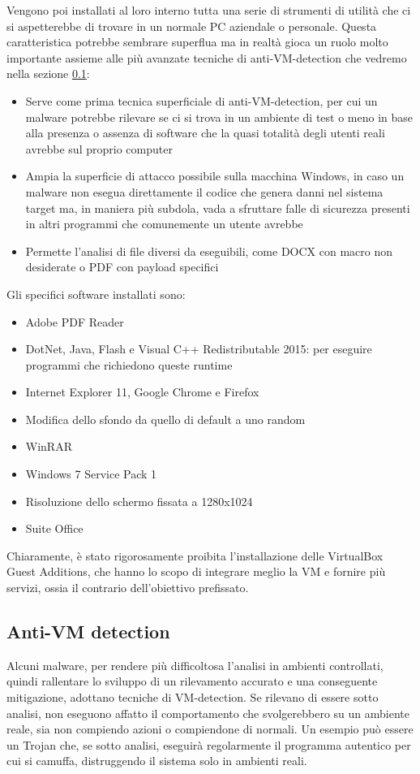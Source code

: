 Vengono poi installati al loro interno tutta una serie di strumenti di utilità che ci si aspetterebbe di trovare in un normale PC aziendale o personale. Questa caratteristica potrebbe sembrare superflua ma in realtà gioca un ruolo molto importante assieme alle più avanzate tecniche di anti-VM-detection che vedremo nella sezione \ref{chap:dynamic-anti-vm-detection}:
\begin{itemize}
    \item Serve come prima tecnica superficiale di anti-VM-detection, per cui un malware potrebbe rilevare se ci si trova in un ambiente di test o meno in base alla presenza o assenza di software che la quasi totalità degli utenti reali avrebbe sul proprio computer
    \item Ampia la superficie di attacco possibile sulla macchina Windows, in caso un malware non esegua direttamente il codice che genera danni nel sistema target ma, in maniera più subdola, vada a sfruttare falle di sicurezza presenti in altri programmi che comunemente un utente avrebbe
    \item Permette l'analisi di file diversi da eseguibili, come DOCX con macro non desiderate o PDF con payload specifici
\end{itemize}

Gli specifici software installati sono:
\begin{itemize}
    \item Adobe PDF Reader
    \item DotNet, Java, Flash e Visual C++ Redistributable 2015: per eseguire programmi che richiedono queste runtime
    \item Internet Explorer 11, Google Chrome e Firefox
    \item Modifica dello sfondo da quello di default a uno random
    \item WinRAR
    \item Windows 7 Service Pack 1
    \item Risoluzione dello schermo fissata a 1280x1024
    \item Suite Office
\end{itemize}

Chiaramente, è stato rigorosamente proibita l'installazione delle VirtualBox Guest Additions, che hanno lo scopo di integrare meglio la VM e fornire più servizi, ossia il contrario dell'obiettivo prefissato.

\subsection{Anti-VM detection}
\label{chap:dynamic-anti-vm-detection}
Alcuni malware, per rendere più difficoltosa l'analisi in ambienti controllati, quindi rallentare lo sviluppo di un rilevamento accurato e una conseguente mitigazione, adottano tecniche di VM-detection. Se rilevano di essere sotto analisi, non eseguono affatto il comportamento che svolgerebbero su un ambiente reale, sia non compiendo azioni o compiendone di normali. Un esempio può essere un Trojan che, se sotto analisi, eseguirà regolarmente il programma autentico per cui si camuffa, distruggendo il sistema solo in ambienti reali.

